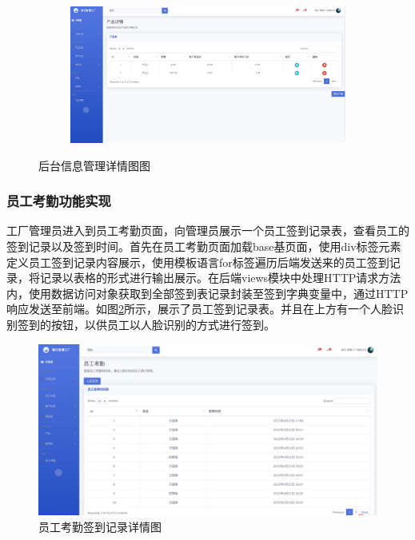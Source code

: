\begin{figure}[H]
\begin{subfigure}{.45\textwidth}
    \end{subfigure}
    \qquad
    \begin{subfigure}{.45\textwidth}
        \centering
        \includegraphics[width=\textwidth]{figures/5productdetail.png}
    \end{subfigure}
    \caption{后台信息管理详情图图}
    \label{fig:bifmtdf}
\end{figure}

\subsubsection{员工考勤功能实现}

工厂管理员进入到员工考勤页面，向管理员展示一个员工签到记录表，查看员工的签到记录以及签到时间。首先在员工考勤页面加载base基页面，使用div标签元素定义员工签到记录内容展示，使用模板语言for标签遍历后端发送来的员工签到记录，将记录以表格的形式进行输出展示。在后端views模块中处理HTTP请求方法内，使用数据访问对象获取到全部签到表记录封装至签到字典变量中，通过HTTP响应发送至前端。如图\ref{fig:empleatd}所示，展示了员工签到记录表。并且在上方有一个人脸识别签到的按钮，以供员工以人脸识别的方式进行签到。

\begin{figure}[H]
    \centering
    \includegraphics[width=.75\textwidth]{figures/5empleatd.png}
    \caption{员工考勤签到记录详情图}
    \label{fig:empleatd}
\end{figure}

